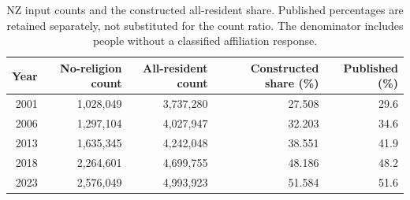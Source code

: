 \begin{table}[!htbp]\centering\small
\caption{NZ input counts and the constructed all-resident share. Published percentages are retained separately, not substituted for the count ratio. The denominator includes people without a classified affiliation response.}\label{tab:nzdata}
\begin{tabular}{rrrrr}\toprule Year & No-religion count & All-resident count & Constructed share (\%) & Published (\%)\\\midrule
2001 & 1,028,049 & 3,737,280 & 27.508 & 29.6\\
2006 & 1,297,104 & 4,027,947 & 32.203 & 34.6\\
2013 & 1,635,345 & 4,242,048 & 38.551 & 41.9\\
2018 & 2,264,601 & 4,699,755 & 48.186 & 48.2\\
2023 & 2,576,049 & 4,993,923 & 51.584 & 51.6\\
\bottomrule\end{tabular}\end{table}
